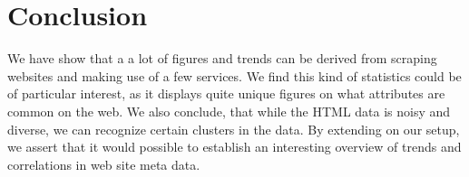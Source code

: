 \section{Conclusion}
\label{sec:conclusion}
We have show that a a lot of figures and trends can be derived from scraping websites and making use of a few services. We find this kind of statistics could be of particular interest, as it displays quite unique figures on what attributes are common on the web. We also conclude, that while the HTML data is noisy and diverse, we can recognize certain clusters in the data. By extending on our setup, we assert that it would possible to establish an interesting overview of trends and correlations in web site meta data.